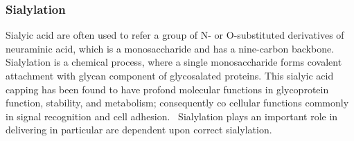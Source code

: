 \subsubsection {Sialylation}
Sialyic acid are often used to refer a group of N- or O-substituted derivatives of neuraminic acid, which is a monosaccharide and has a nine-carbon backbone.~\cite{Vocadlo_2009} Sialylation is a chemical process, where a single monosaccharide forms covalent attachment with glycan component of glycosalated proteins. This sialyic acid capping has been found to have profond molecular functions in glycoprotein function, stability, and metabolism; consequently co cellular functions commonly in signal recognition and cell adhesion.~\cite{Bhide_2016} Sialylation plays an important role in delivering in particular are dependent upon correct sialylation.